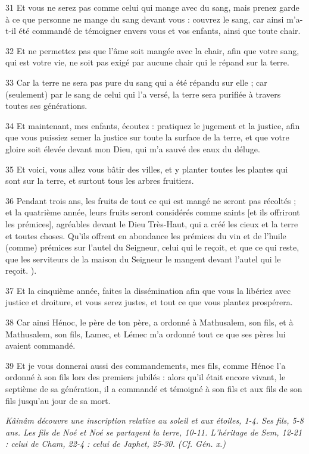 \par 31 Et vous ne serez pas comme celui qui mange avec du sang, mais prenez garde à ce que personne ne mange du sang devant vous : couvrez le sang, car ainsi m'a-t-il été commandé de témoigner envers vous et vos enfants, ainsi que toute chair.
\par 32 Et ne permettez pas que l'âme soit mangée avec la chair, afin que votre sang, qui est votre vie, ne soit pas exigé par aucune chair qui le répand sur la terre.
\par 33 Car la terre ne sera pas pure du sang qui a été répandu sur elle ; car (seulement) par le sang de celui qui l'a versé, la terre sera purifiée à travers toutes ses générations.
\par 34 Et maintenant, mes enfants, écoutez : pratiquez le jugement et la justice, afin que vous puissiez semer la justice sur toute la surface de la terre, et que votre gloire soit élevée devant mon Dieu, qui m'a sauvé des eaux du déluge.
\par 35 Et voici, vous allez vous bâtir des villes, et y planter toutes les plantes qui sont sur la terre, et surtout tous les arbres fruitiers.
\par 36 Pendant trois ans, les fruits de tout ce qui est mangé ne seront pas récoltés ; et la quatrième année, leurs fruits seront considérés comme saints [et ils offriront les prémices], agréables devant le Dieu Très-Haut, qui a créé les cieux et la terre et toutes choses. Qu'ils offrent en abondance les prémices du vin et de l'huile (comme) prémices sur l'autel du Seigneur, celui qui le reçoit, et que ce qui reste, que les serviteurs de la maison du Seigneur le mangent devant l'autel qui le reçoit. ).
\par 37 Et la cinquième année, faites la dissémination afin que vous la libériez avec justice et droiture, et vous serez justes, et tout ce que vous plantez prospérera.
\par 38 Car ainsi Hénoc, le père de ton père, a ordonné à Mathusalem, son fils, et à Mathusalem, son fils, Lamec, et Lémec m'a ordonné tout ce que ses pères lui avaient commandé.
\par 39 Et je vous donnerai aussi des commandements, mes fils, comme Hénoc l'a ordonné à son fils lors des premiers jubilés : alors qu'il était encore vivant, le septième de sa génération, il a commandé et témoigné à son fils et aux fils de son fils jusqu'au jour de sa mort.


\par \textit{Kâinâm découvre une inscription relative au soleil et aux étoiles, 1-4. Ses fils, 5-8 ans. Les fils de Noé et Noé se partagent la terre, 10-11. L'héritage de Sem, 12-21 : celui de Cham, 22-4 : celui de Japhet, 25-30. (Cf. Gén. x.)}

